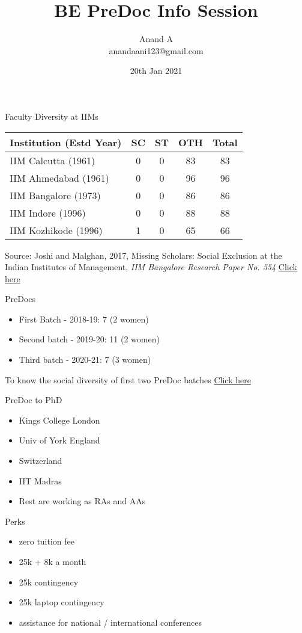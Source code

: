 \documentclass[
  ignorenonframetext,
]{beamer}
\title{BE PreDoc Info Session}
\author[]{Anand A\\anandaani123@gmail.com}
\date{20th Jan 2021}
\begin{document}
\frame{\titlepage}

\begin{frame}{Faculty Diversity at IIMs}

\begin{longtable}[]{@{}lcccc@{}}
\toprule
Institution (Estd Year) & SC & ST & OTH & Total \tabularnewline
\midrule
IIM Calcutta (1961) & 0 & 0 & 83 & 83 \tabularnewline
IIM Ahmedabad (1961) & 0 & 0 & 96 & 96 \tabularnewline
IIM Bangalore (1973) & 0 & 0 & 86 & 86 \tabularnewline
IIM Indore (1996) & 0 & 0 & 88 & 88 \tabularnewline
IIM Kozhikode (1996) & 1 & 0 & 65 & 66\tabularnewline
\bottomrule
\end{longtable}
  

Source: Joshi and Malghan, 2017, Missing Scholars: Social Exclusion at the Indian Institutes of Management, \textit{IIM Bangalore Research Paper No. 554} \href{https://papers.ssrn.com/sol3/papers.cfm?abstract_id=3015212}{Click here} 
    
\end{frame}

\begin{frame}{PreDocs}
\begin{itemize}
    \item First Batch - 2018-19: 7 (2 women)
    \item Second batch - 2019-20: 11 (2 women)
    \item Third batch - 2020-21: 7 (3 women)
\end{itemize}

\vspace{1cm}
\centering
To know the social diversity of first two PreDoc batches \href{https://drive.google.com/file/d/1axf8vmFTCyADJ_RrOysVxvzUHkiYFlSo/view?usp=sharing}{Click here}
\end{frame}

\begin{frame}{PreDoc to PhD}
\begin{itemize}
    \item Kings College London
    \item Univ of York England
    \item Switzerland 
    \item IIT Madras
    \item Rest are working as RAs and AAs
\end{itemize}
\end{frame}
    
\begin{frame}{Perks}
    \begin{itemize}
        \item zero tuition fee
        \item 25k + 8k a month
        \item 25k contingency
        \item 25k laptop contingency
        \item assistance for national / international conferences
    \end{itemize}
\end{frame}
\end{document}
